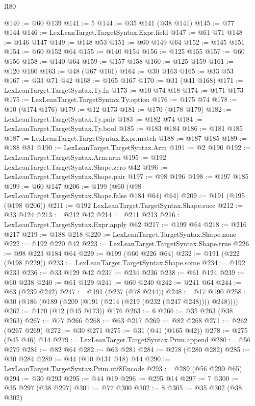 \begin{lexlean}{R80}
\begin{coremodule}
@140 := @60 @139
@141 := 5
@144 := @35 @141 (@38 @141)
@145 := @77 @144
@146 := LexLeanTarget.TargetSyntax.Expr.field
@147 := @61 @71
@148 := @146 @147
@149 := @148 @53
@151 := @60 @149 @64
@152 := @145 @151
@154 := @60 @152 @64
@155 := @140 @154
@156 := @125 @155
@157 := @60 @156
@158 := @140 @64
@159 := @157 @158
@160 := @125 @159
@161 := @120 @160
@163 := @48 (@67 @161)
@164 := @30 @163
@165 := @33 @53
@167 := @33 @71 @42
@168 := @165 @167
@170 := @31 (@41 @168)
@171 := LexLeanTarget.TargetSyntax.Ty.fn
@173 := @10 @74 @18
@174 := @171 @173
@175 := LexLeanTarget.TargetSyntax.Ty.option
@176 := @175 @74
@178 := @10 (@174 @176)
@179 := @12 @173
@181 := @170 (@178 @179)
@182 := LexLeanTarget.TargetSyntax.Ty.pair
@183 := @182 @74
@184 := LexLeanTarget.TargetSyntax.Ty.bool
@185 := @183 @184
@186 := @181 @185
@187 := LexLeanTarget.TargetSyntax.Expr.match
@188 := @187 @185
@189 := @188 @81
@190 := LexLeanTarget.TargetSyntax.Arm
@191 := @2 @190
@192 := LexLeanTarget.TargetSyntax.Arm.arm
@195 := @192 LexLeanTarget.TargetSyntax.Shape.zero @42
@196 := LexLeanTarget.TargetSyntax.Shape.pair
@197 := @98 @196
@198 := @197 @185
@199 := @60 @147
@206 := @199 (@60 (@98 LexLeanTarget.TargetSyntax.Shape.false @184 @64) @64)
@209 := @191 (@195 (@198 @206))
@211 := @192 LexLeanTarget.TargetSyntax.Shape.succ
@212 := @33 @124
@213 := @212 @42
@214 := @211 @213
@216 := LexLeanTarget.TargetSyntax.Expr.apply @62
@217 := @199 @64
@218 := @216 @217
@219 := @188 @218
@220 := LexLeanTarget.TargetSyntax.Shape.none
@222 := @192 @220 @42
@223 := LexLeanTarget.TargetSyntax.Shape.true
@226 := @98 @223 @184 @64
@229 := @199 (@60 @226 @64)
@232 := @191 (@222 (@198 @229))
@233 := LexLeanTarget.TargetSyntax.Shape.some
@234 := @192 @233
@236 := @33 @129 @42
@237 := @234 @236
@238 := @61 @124
@239 := @60 @238
@240 := @61 @129
@241 := @60 @240
@242 := @241 @64
@244 := @63 (@239 @242)
@247 := @191 (@237 (@78 @244))
@248 := @17 @190
@258 := @30 (@186 (@189 (@209 (@191 (@214 (@219 (@232 (@247 @248)))) @248))))
@262 := @170 (@12 (@45 @173)) @176
@263 := 6
@266 := @35 @263 (@38 @263)
@267 := @77 @266
@268 := @63 @217
@269 := @82 @268
@271 := @262 (@267 @269)
@272 := @30 @271
@275 := @31 (@41 (@165 @42))
@278 := @275 (@45 @46) @14
@279 := LexLeanTarget.TargetSyntax.Prim.append
@280 := @56 @279
@281 := @82 @64
@282 := @63 @281
@284 := @278 (@280 @282)
@285 := @30 @284
@289 := @44 (@10 @131 @18) @14
@290 := LexLeanTarget.TargetSyntax.Prim.utf8Encode
@293 := @289 (@56 @290 @65)
@294 := @30 @293
@295 := @44 @19
@296 := @295 @14
@297 := 7
@300 := @35 @297 (@38 @297)
@301 := @77 @300
@302 := 8
@305 := @35 @302 (@38 @302)

\end{coremodule}
\end{lexlean}
